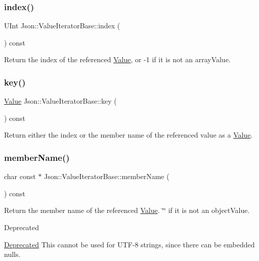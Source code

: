\subsubsection{\texorpdfstring{index()}{index()}}
{\footnotesize\ttfamily U\+Int Json\+::\+Value\+Iterator\+Base\+::index (\begin{DoxyParamCaption}{ }\end{DoxyParamCaption}) const}

Return the index of the referenced \hyperlink{classJson_1_1Value}{Value}, or -\/1 if it is not an array\+Value. \mbox{\label{classJson_1_1ValueIteratorBase_a3838ba39c43c518cf3ed4aa6ce78ccad}} 
\subsubsection{\texorpdfstring{key()}{key()}}
{\footnotesize\ttfamily \hyperlink{classJson_1_1Value}{Value} Json\+::\+Value\+Iterator\+Base\+::key (\begin{DoxyParamCaption}{ }\end{DoxyParamCaption}) const}

Return either the index or the member name of the referenced value as a \hyperlink{classJson_1_1Value}{Value}. \mbox{\label{classJson_1_1ValueIteratorBase_a54765da6759fd3f1edcbfbaf308ec263}} 
\subsubsection{\texorpdfstring{member\+Name()}{memberName()}\hspace{0.1cm}{\footnotesize\ttfamily [1/2]}}
{\footnotesize\ttfamily char const  $\ast$ Json\+::\+Value\+Iterator\+Base\+::member\+Name (\begin{DoxyParamCaption}{ }\end{DoxyParamCaption}) const}

Return the member name of the referenced \hyperlink{classJson_1_1Value}{Value}. \char`\"{}\char`\"{} if it is not an object\+Value. \begin{DoxyRefDesc}{Deprecated}
\item[\hyperlink{deprecated__deprecated000004}{Deprecated}]This cannot be used for U\+T\+F-\/8 strings, since there can be embedded nulls. \end{DoxyRefDesc}
\mbox{\label{classJson_1_1ValueIteratorBase_a391c9cbd0edf9a447b37df00e8ce6059}} 
